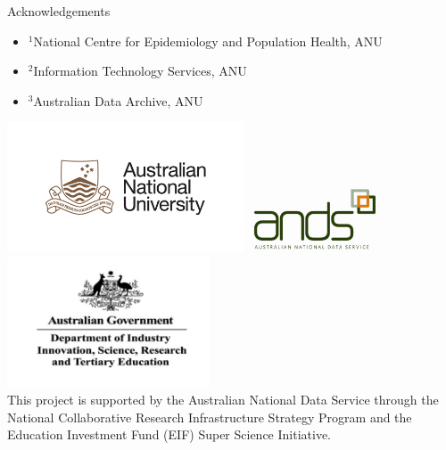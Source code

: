 \documentclass[final]{beamer}
\begin{document}
\begin{frame}{}
\begin{textblock}{17}
\begin{block}{Acknowledgements}    
\begin{tiny}
\begin{itemize}
\item $^1$National Centre for Epidemiology and Population Health, ANU
\item $^2$Information Technology Services, ANU
\item $^3$Australian Data Archive, ANU 
\end{itemize}
\includegraphics[width=7cm]{ANU_LOGO_cmyk_56mm.png}
\includegraphics[width=4cm]{andslogo.pdf}
\includegraphics[width=6cm]{deptlogo.pdf} \\
This project is supported by the Australian National Data Service through the National Collaborative Research Infrastructure Strategy Program and the Education Investment Fund (EIF) Super Science Initiative.
\end{tiny}
\end{block}

\end{textblock}

\end{frame}
\end{document}
